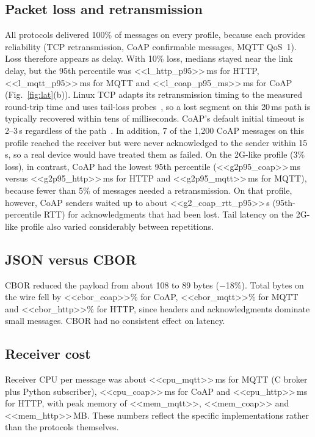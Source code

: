 \documentclass[conference]{IEEEtran}
\begin{document}
\subsection{Packet loss and retransmission}
All protocols delivered 100\% of messages on every profile, because each provides reliability (TCP retransmission, CoAP confirmable messages, MQTT QoS~1). Loss therefore appears as delay. With 10\% loss, medians stayed near the link delay, but the 95th percentile was <<l_http_p95>>\,ms for HTTP, <<l_mqtt_p95>>\,ms for MQTT and <<l_coap_p95_ms>>\,ms for CoAP (Fig.~\ref{fig:lat}(b)). Linux TCP adapts its retransmission timing to the measured round-trip time and uses tail-loss probes~\cite{rfc6298,rfc8985}, so a lost segment on this 20\,ms path is typically recovered within tens of milliseconds. CoAP's default initial timeout is 2--3\,s regardless of the path~\cite{rfc7252}. In addition, 7 of the 1,200 CoAP messages on this profile reached the receiver but were never acknowledged to the sender within 15\,s, so a real device would have treated them as failed. On the 2G-like profile (3\% loss), in contrast, CoAP had the lowest 95th percentile (<<g2p95_coap>>\,ms versus <<g2p95_http>>\,ms for HTTP and <<g2p95_mqtt>>\,ms for MQTT), because fewer than 5\% of messages needed a retransmission. On that profile, however, CoAP senders waited up to about <<g2_coap_rtt_p95>>\,s (95th-percentile RTT) for acknowledgments that had been lost. Tail latency on the 2G-like profile also varied considerably between repetitions.

\subsection{JSON versus CBOR}
CBOR reduced the payload from about 108 to 89 bytes ($-$18\%). Total bytes on the wire fell by <<cbor_coap>>\% for CoAP, <<cbor_mqtt>>\% for MQTT and <<cbor_http>>\% for HTTP, since headers and acknowledgments dominate small messages. CBOR had no consistent effect on latency.

\subsection{Receiver cost}
Receiver CPU per message was about <<cpu_mqtt>>\,ms for MQTT (C broker plus Python subscriber), <<cpu_coap>>\,ms for CoAP and <<cpu_http>>\,ms for HTTP, with peak memory of <<mem_mqtt>>, <<mem_coap>> and <<mem_http>>\,MB. These numbers reflect the specific implementations rather than the protocols themselves.
\end{document}
